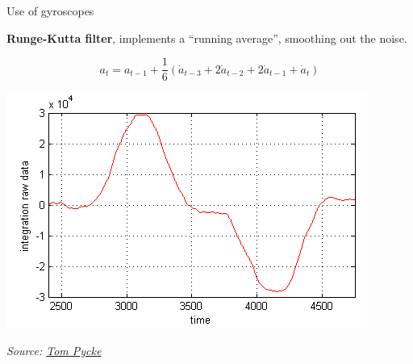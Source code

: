 \documentclass[compress]{beamer}
\newcommand{\source}[2]{{\tiny\it Source: \href{#1}{#2}}}
\begin{document}
\begin{frame}{Use of gyroscopes}
{            {\bf Runge-Kutta filter}, implements a ``running average'', smoothing out
        the noise.

        \[
            a_t = a_{t-1} + \frac{1}{6}(\dot{a}_{t-3} + 2\dot{a}_{t-2} + 2\dot{a}_{t-1} + \dot{a}_t)
            \]

        \begin{center}
            \includegraphics[width=0.6\linewidth]{mems-filtering}

        \source{http://tom.pycke.be/mav/70/gyroscope-to-roll-pitch-and-yaw}{Tom Pycke}
        \end{center}

    }
\end{frame}

\end{document}
